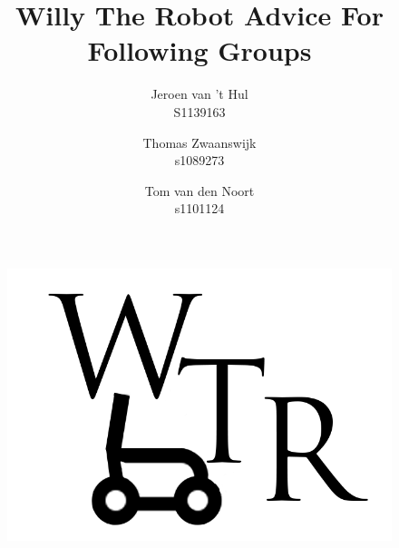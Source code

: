 \documentclass{article} %
\title{\huge Willy The Robot Advice For Following Groups}
\author{Jeroen van 't Hul\\S1139163  \and Thomas Zwaanswijk\\s1089273 \and Tom van den Noort\\s1101124}
\date{\parbox{\linewidth}{\centering%
	\today\endgraf\bigskip
	Supervisor \hspace*{3cm} Main Stakeholder \endgraf\medskip
	Mischa Mol \hspace*{3cm} Ilja Clabbers \endgraf\bigskip
	Windesheim Zwolle\endgraf}}
\begin{document}
\maketitle

\begin{figure}[H]
\centering
\includegraphics[width=12 cm]{WTRLogo.png}
\end{figure}
\thispagestyle{empty}
\newpage
\setcounter{page}{1}
\tableofcontents
\newpage








\appendix  %

\newpage


\end{document}
